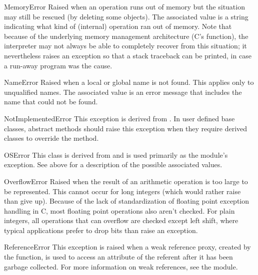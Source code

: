 \begin{excdesc}{MemoryError}
  Raised when an operation runs out of memory but the situation may
  still be rescued (by deleting some objects).  The associated value is
  a string indicating what kind of (internal) operation ran out of memory.
  Note that because of the underlying memory management architecture
  (C's  function), the interpreter may not
  always be able to completely recover from this situation; it
  nevertheless raises an exception so that a stack traceback can be
  printed, in case a run-away program was the cause.
\end{excdesc}

\begin{excdesc}{NameError}
  Raised when a local or global name is not found.  This applies only
  to unqualified names.  The associated value is an error message that
  includes the name that could not be found.
\end{excdesc}

\begin{excdesc}{NotImplementedError}
  This exception is derived from .  In user
  defined base classes, abstract methods should raise this exception
  when they require derived classes to override the method.
\end{excdesc}

\begin{excdesc}{OSError}
  This class is derived from  and is used
  primarily as the  module's  exception.
  See  above for a description of the
  possible associated values.
\end{excdesc}

\begin{excdesc}{OverflowError}
  Raised when the result of an arithmetic operation is too large to be
  represented.  This cannot occur for long integers (which would rather
  raise  than give up).  Because of the lack of
  standardization of floating point exception handling in C, most
  floating point operations also aren't checked.  For plain integers,
  all operations that can overflow are checked except left shift, where
  typical applications prefer to drop bits than raise an exception.
\end{excdesc}

\begin{excdesc}{ReferenceError}
  This exception is raised when a weak reference proxy, created by the
   function, is used to access
  an attribute of the referent after it has been garbage collected.
  For more information on weak references, see the 
  module.
\end{excdesc}

